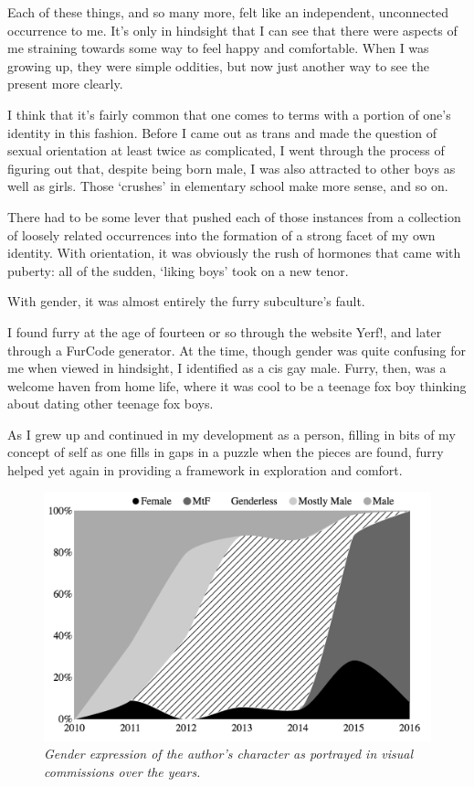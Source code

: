 Each of these things, and so many more, felt like an independent, unconnected occurrence to me.  It's only in hindsight that I can see that there were aspects of me straining towards some way to feel happy and comfortable.  When I was growing up, they were simple oddities, but now just another way to see the present more clearly.

I think that it's fairly common that one comes to terms with a portion of one's identity in this fashion.  Before I came out as trans and made the question of sexual orientation at least twice as complicated, I went through the process of figuring out that, despite being born male, I was also attracted to other boys as well as girls.  Those `crushes' in elementary school make more sense, and so on.

There had to be some lever that pushed each of those instances from a collection of loosely related occurrences into the formation of a strong facet of my own identity.  With orientation, it was obviously the rush of hormones that came with puberty: all of the sudden, `liking boys' took on a new tenor.

With gender, it was almost entirely the furry subculture's fault.

I found furry at the age of fourteen or so through the website Yerf!, and later through a FurCode generator.  At the time, though gender was quite confusing for me when viewed in hindsight, I identified as a cis gay male.  Furry, then, was a welcome haven from home life, where it was cool to be a teenage fox boy thinking about dating other teenage fox boys.

As I grew up and continued in my development as a person, filling in bits of my concept of self as one fills in gaps in a puzzle when the pieces are found, furry helped yet again in providing a framework in exploration and comfort.

\begin{figure}
  \centering
  \includegraphics[scale=0.45]{assets/commissions-sex-preview.png}
  \caption{\textit{Gender expression of the author's character as portrayed in visual commissions over the years.}}
  \label{fig:commissions-sex}
\end{figure}

